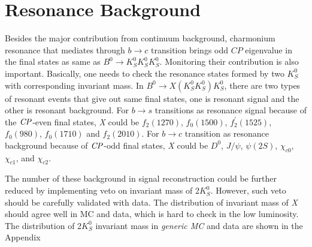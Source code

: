 \section{Resonance Background}
Besides the major contribution from continuum background, charmonium resonance that mediates through $b \to c$ transition brings odd $\textit{CP}$ eigenvalue in the final states as same as $B^0 \to K_S^0  K_S^0  K_S^0$. Monitoring their contribution is also important. Basically, one needs to check the resonance states formed by two $K_S^0$ with corresponding invariant mass. In $B^0 \to X(K_S^0 K_S^0) K_S^0$,  there are two types of resonant events that give out same final states, one is resonant signal and the other is resonant background. For $b \to s$ transitions as resonance signal because of the $\it{CP}$-even final states, \textit{X} could be $f_2(1270)$, $f_0(1500)$, $f_{2}^{'}(1525)$, $f_0(980)$, $f_0(1710)$ and $f_2(2010)$. For $b \to c$ transition as resonance background because of $\it{CP}$-odd final states, \textit{X} could be $D^0$, $J/\psi$, $\psi(2S)$,  $\chi_{c0}$, $\chi_{c1}$, and $\chi_{c2}$.

The number of these background in signal reconstruction could be further reduced by implementing veto on invariant mass of 2$K_S^0$. However, such veto should be carefully validated with data. The distribution of invariant mass of \textit{X} should agree well in MC and data, which is hard to check in the low luminosity. The distribution of 2$K_S^0$ invariant mass in \textit{generic MC} and data are shown in the Appendix 


